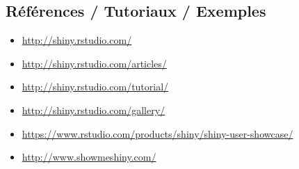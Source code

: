 \documentclass[]{article}
\providecommand{\tightlist}{%
  \setlength{\itemsep}{0pt}\setlength{\parskip}{0pt}}
\begin{document}
\subsection{Références / Tutoriaux /
Exemples}\label{references-tutoriaux-exemples}

\begin{itemize}
\tightlist
\item
  \url{http://shiny.rstudio.com/}
\item
  \url{http://shiny.rstudio.com/articles/}
\item
  \url{http://shiny.rstudio.com/tutorial/}
\item
  \url{http://shiny.rstudio.com/gallery/}
\item
  \url{https://www.rstudio.com/products/shiny/shiny-user-showcase/}
\item
  \url{http://www.showmeshiny.com/}
\end{itemize}
\end{document}
